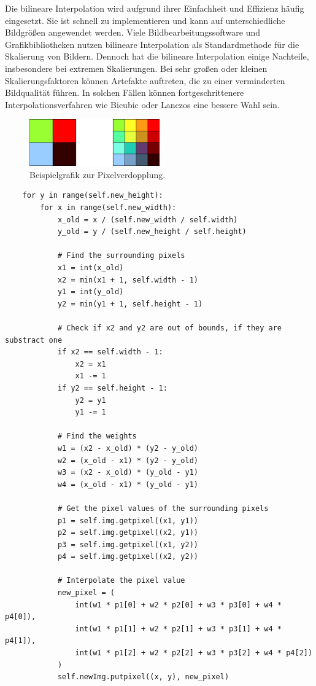         Die bilineare Interpolation wird aufgrund ihrer Einfachheit und Effizienz häufig eingesetzt.
        Sie ist schnell zu implementieren und kann auf unterschiedliche Bildgrößen angewendet werden.
        Viele Bildbearbeitungssoftware und Grafikbibliotheken nutzen bilineare Interpolation als Standardmethode für die Skalierung von Bildern.
        Dennoch hat die bilineare Interpolation einige Nachteile, insbesondere bei extremen Skalierungen.
        Bei sehr großen oder kleinen Skalierungsfaktoren können Artefakte auftreten, die zu einer verminderten Bildqualität führen.
        In solchen Fällen können fortgeschrittenere Interpolationsverfahren wie Bicubic oder Lanczos eine bessere Wahl sein.


    \begin{figure}[h]
        \centering
        \includegraphics[width=0.5\textwidth]{img/pixel_verdopplung.png}
        \caption{Beispielgrafik zur Pixelverdopplung.}
        \label{fig:beispielgrafik_zur_pixelverdopplung}
    \end{figure}
    
    
    \begin{lstlisting}
    for y in range(self.new_height):
        for x in range(self.new_width):
            x_old = x / (self.new_width / self.width)
            y_old = y / (self.new_height / self.height)
    
            # Find the surrounding pixels
            x1 = int(x_old)
            x2 = min(x1 + 1, self.width - 1)
            y1 = int(y_old)
            y2 = min(y1 + 1, self.height - 1)
    
            # Check if x2 and y2 are out of bounds, if they are substract one
            if x2 == self.width - 1:
                x2 = x1
                x1 -= 1
            if y2 == self.height - 1:
                y2 = y1
                y1 -= 1
    
            # Find the weights
            w1 = (x2 - x_old) * (y2 - y_old)
            w2 = (x_old - x1) * (y2 - y_old)
            w3 = (x2 - x_old) * (y_old - y1)
            w4 = (x_old - x1) * (y_old - y1)
    
            # Get the pixel values of the surrounding pixels
            p1 = self.img.getpixel((x1, y1))
            p2 = self.img.getpixel((x2, y1))
            p3 = self.img.getpixel((x1, y2))
            p4 = self.img.getpixel((x2, y2))
    
            # Interpolate the pixel value
            new_pixel = (
                int(w1 * p1[0] + w2 * p2[0] + w3 * p3[0] + w4 * p4[0]),
                int(w1 * p1[1] + w2 * p2[1] + w3 * p3[1] + w4 * p4[1]),
                int(w1 * p1[2] + w2 * p2[2] + w3 * p3[2] + w4 * p4[2])
            )
            self.newImg.putpixel((x, y), new_pixel)
    \end{lstlisting}
    
